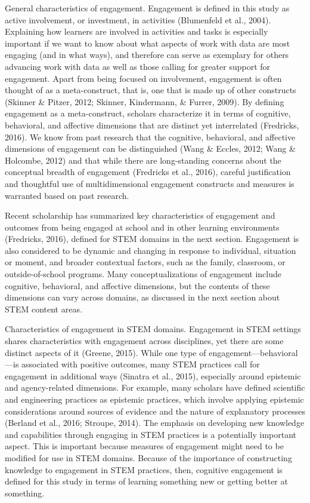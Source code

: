 \documentclass[]{msu-thesis}
\theoremstyle{definition}
\theoremstyle{definition}
\theoremstyle{definition}
\theoremstyle{remark}
\begin{document}
General characteristics of engagement. Engagement is defined in this
study as active involvement, or investment, in activities (Blumenfeld et
al., 2004). Explaining how learners are involved in activities and tasks
is especially important if we want to know about what aspects of work
with data are most engaging (and in what ways), and therefore can serve
as exemplary for others advancing work with data as well as those
calling for greater support for engagement. Apart from being focused on
involvement, engagement is often thought of as a meta-construct, that
is, one that is made up of other constructs (Skinner \& Pitzer, 2012;
Skinner, Kindermann, \& Furrer, 2009). By defining engagement as a
meta-construct, scholars characterize it in terms of cognitive,
behavioral, and affective dimensions that are distinct yet interrelated
(Fredricks, 2016). We know from past research that the cognitive,
behavioral, and affective dimensions of engagement can be distinguished
(Wang \& Eccles, 2012; Wang \& Holcombe, 2012) and that while there are
long-standing concerns about the conceptual breadth of engagement
(Fredricks et al., 2016), careful justification and thoughtful use of
multidimensional engagement constructs and measures is warranted based
on past research.

Recent scholarship has summarized key characteristics of engagement and
outcomes from being engaged at school and in other learning environments
(Fredricks, 2016), defined for STEM domains in the next section.
Engagement is also considered to be dynamic and changing in response to
individual, situation or moment, and broader contextual factors, such as
the family, classroom, or outside-of-school programs. Many
conceptualizations of engagement include cognitive, behavioral, and
affective dimensions, but the contents of these dimensions can vary
across domains, as discussed in the next section about STEM content
areas.

Characteristics of engagement in STEM domains. Engagement in STEM
settings shares characteristics with engagement across disciplines, yet
there are some distinct aspects of it (Greene, 2015). While one type of
engagement---behavioral---is associated with positive outcomes, many
STEM practices call for engagement in additional ways (Sinatra et al.,
2015), especially around epistemic and agency-related dimensions. For
example, many scholars have defined scientific and engineering practices
as epistemic practices, which involve applying epistemic considerations
around sources of evidence and the nature of explanatory processes
(Berland et al., 2016; Stroupe, 2014). The emphasis on developing new
knowledge and capabilities through engaging in STEM practices is a
potentially important aspect. This is important because measures of
engagement might need to be modified for use in STEM domains. Because of
the importance of constructing knowledge to engagement in STEM
practices, then, cognitive engagement is defined for this study in terms
of learning something new or getting better at something.
\end{document}
